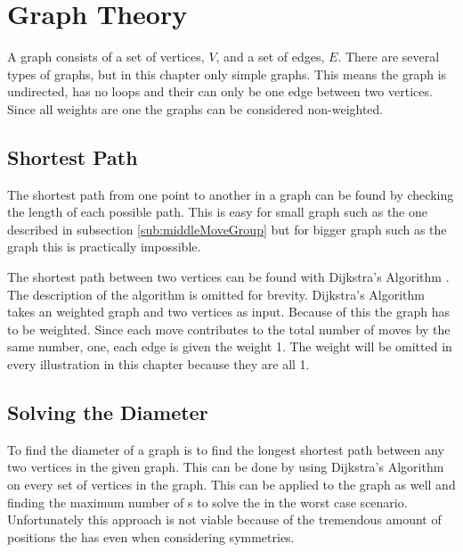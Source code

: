 \chapter {Graph Theory}
\label{chap:graphTheory}

A graph consists of a set of vertices, $V$, and a set of edges, $E$. There are several types of graphs, but in this chapter only simple graphs. This means the graph is undirected, has no loops and their can only be one edge between two vertices. Since all weights are one the graphs can be considered non-weighted.\cite[p. 592]{Rosen07}

\section{Shortest Path}
The shortest path from one point to another in a graph can be found by checking the length of each possible path. This is easy for small graph such as the one described in subsection \ref{sub:middleMoveGroup} but for bigger graph such as the \rubik{} graph this is practically impossible. 

The shortest path between two vertices can be found with Dijkstra's Algorithm \cite[p. 651]{Rosen07}. The description of the algorithm is omitted for brevity. Dijkstra's Algorithm takes an weighted graph and two vertices as input. Because of this the \rubik{} graph has to be weighted. Since each move contributes to the total number of moves by the same number, one, each edge is given the weight 1. The weight will be omitted in every illustration in this chapter because they are all 1.  

\section{Solving the Diameter}
To find the diameter of a graph is to find the longest shortest path between any two vertices in the given graph. This can be done by using Dijkstra's Algorithm on every set of vertices in the graph. This can be applied to the \rubik{} graph as well and finding the maximum number of \twist{}s to solve the \rubik{} in the worst case scenario. Unfortunately this approach is not viable because of the tremendous amount of positions the \rubik{} has even when considering symmetries.

